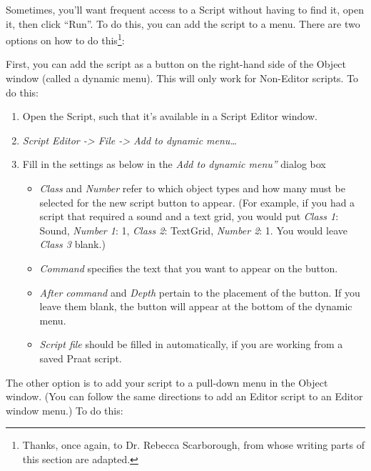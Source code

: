 \label{menushortcuts}

Sometimes, you'll want frequent access to a Script without having to
find it, open it, then click ``Run''. To do this, you can add the script
to a menu. There are two options on how to do
this\footnote{Thanks, once again, to Dr. Rebecca Scarborough, from whose writing parts of this section are adapted.}:

First, you can add the script as a button on the right-hand side of the
Object window (called a dynamic menu). This will only work for
Non-Editor scripts. To do this:

\begin{enumerate}
\def\labelenumi{\arabic{enumi}.}
\tightlist
\item
  Open the Script, such that it's available in a Script Editor window.
\item
  \emph{Script Editor -\textgreater{} File -\textgreater{} Add to
  dynamic menu\ldots{}}
\item
  Fill in the settings as below in the \emph{Add to dynamic menu''}
  dialog box

  \begin{itemize}
  \tightlist
  \item
    \emph{Class} and \emph{Number} refer to which object types and how
    many must be selected for the new script button to appear. (For
    example, if you had a script that required a sound and a text grid,
    you would put \emph{Class 1}: Sound, \emph{Number 1}: 1, \emph{Class
    2}: TextGrid, \emph{Number 2}: 1. You would leave \emph{Class 3}
    blank.)
  \item
    \emph{Command} specifies the text that you want to appear on the
    button.
  \item
    \emph{After command} and \emph{Depth} pertain to the placement of
    the button. If you leave them blank, the button will appear at the
    bottom of the dynamic menu.
  \item
    \emph{Script file} should be filled in automatically, if you are
    working from a saved Praat script.
  \end{itemize}
\end{enumerate}

The other option is to add your script to a pull-down menu in the Object
window. (You can follow the same directions to add an Editor script to
an Editor window menu.) To do this:

